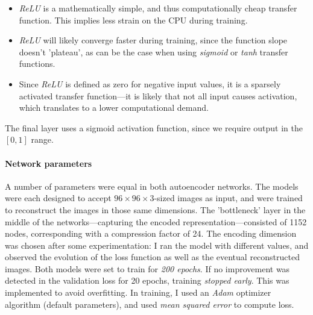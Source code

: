 \begin{itemize}

	\item{\textit{ReLU} is a mathematically simple, and thus computationally cheap transfer function. This implies less strain on the CPU during training.}
	\item{\textit{ReLU} will likely converge faster during training, since the function slope doesn't 'plateau', as can be the case when using \textit{sigmoid} or \textit{tanh} transfer functions.}
	\item{Since \textit{ReLU} is defined as zero for negative input values, it is a sparsely activated transfer function---it is likely that not all input causes activation, which translates to a lower computational demand.}

\end{itemize}

The final layer uses a sigmoid activation function, since we require output in the $[0, 1]$ range.

\paragraph{Network parameters} A number of parameters were equal in both autoencoder networks. The models were each designed to accept $96\times96\times3$-sized images as input, and were trained to reconstruct the images in those same dimensions. The 'bottleneck' layer in the middle of the networks---capturing the encoded representation---consisted of 1152 nodes, corresponding with a compression factor of 24. The encoding dimension was chosen after some experimentation: I ran the model with different values, and observed the evolution of the loss function as well as the eventual reconstructed images. Both models were set to train for \textit{200 epochs}. If no improvement was detected in the validation loss for 20 epochs, training \textit{stopped early}. This was implemented to avoid overfitting. In training, I used an \textit{Adam} optimizer algorithm (default parameters), and used \textit{mean squared error} to compute loss. 

